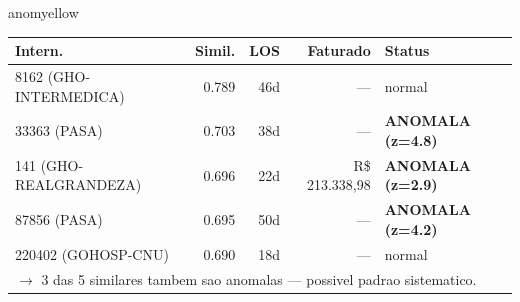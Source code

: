 \documentclass[a4paper,10pt]{article}
\begin{document}
\begin{anomalycard}[Internacao 164272 | GHO-PETROBRAS | MODERADO (z=2.31)]{anomyellow}
\begin{tabular}{l r r r l}\toprule\textbf{Intern.} & \textbf{Simil.} & \textbf{LOS} & \textbf{Faturado} & \textbf{Status} \\\midrule
8162 (GHO-INTERMEDICA) & 0.789 & 46d & --- & \textcolor{jcubeblue}{normal} \\
33363 (PASA) & 0.703 & 38d & --- & \textcolor{anomred}{\textbf{ANOMALA (z=4.8)}} \\
141 (GHO-REALGRANDEZA) & 0.696 & 22d & R\$ 213.338,98 & \textcolor{anomred}{\textbf{ANOMALA (z=2.9)}} \\
87856 (PASA) & 0.695 & 50d & --- & \textcolor{anomred}{\textbf{ANOMALA (z=4.2)}} \\
220402 (GOHOSP-CNU) & 0.690 & 18d & --- & \textcolor{jcubeblue}{normal} \\
\multicolumn{5}{l}{\textcolor{anomred}{\small $\rightarrow$ 3 das 5 similares tambem sao anomalas --- possivel padrao sistematico.}} \\
\bottomrule\end{tabular}



\end{anomalycard}

\newpage
\end{document}
